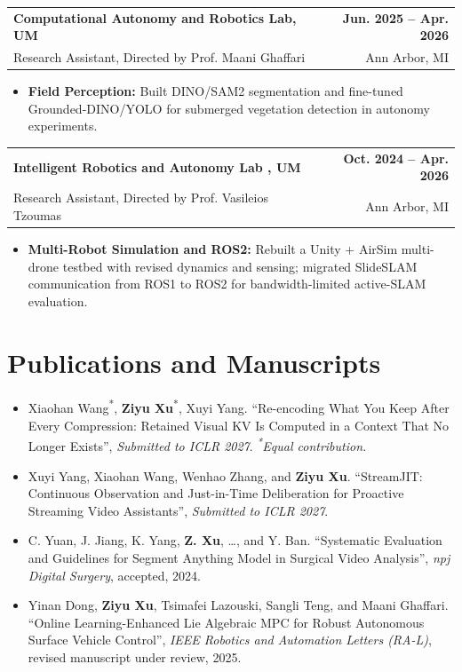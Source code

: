 \documentclass[11pt,letterpaper]{article}
\makeatletter
\newcommand{\resumeSubheading}[4]{
    \begin{tabularx}{\textwidth}{@{}Xr@{}}
        \textbf{#1} & \textbf{#2} \\
        #3 & #4 \\
    \end{tabularx}
}
\newcommand{\resumeItem}[1]{
    \item #1
}
\makeatother
\begin{document}
\resumeSubheading
{Computational Autonomy and Robotics Lab, UM }
{Jun. 2025 -- Apr. 2026}
{\hspace*{1.4em}Research Assistant, Directed by Prof. Maani Ghaffari}
{Ann Arbor, MI}
\begin{itemize}[leftmargin=2.4em, itemsep=0.5pt, topsep=0pt]
\small
\resumeItem{\textbf{Field Perception:} Built DINO/SAM2 segmentation and fine-tuned Grounded-DINO/YOLO for submerged vegetation detection in autonomy experiments.}
\end{itemize}

\resumeSubheading
{Intelligent Robotics and Autonomy Lab , UM}
{Oct. 2024 -- Apr. 2026}
{\hspace*{1.4em}Research Assistant, Directed by Prof. Vasileios Tzoumas}
{Ann Arbor, MI}
\begin{itemize}[leftmargin=2.4em, itemsep=0.5pt, topsep=0pt]
\small
\resumeItem{\textbf{Multi-Robot Simulation and ROS2:} Rebuilt a Unity + AirSim multi-drone testbed with revised dynamics and sensing; migrated SlideSLAM communication from ROS1 to ROS2 for bandwidth-limited active-SLAM evaluation.}
\end{itemize}

\section*{Publications and Manuscripts}
\begin{itemize}[leftmargin=1.4em,itemsep=3pt,topsep=2pt]
\small
\item Xiaohan Wang\textsuperscript{*}, \textbf{Ziyu Xu}\textsuperscript{*}, Xuyi Yang.      ``Re-encoding What You Keep After Every Compression: Retained Visual KV Is Computed in a Context That No Longer Exists'',      \textit{Submitted to ICLR 2027}. \textit{\textsuperscript{*}Equal contribution.}
\item Xuyi Yang, Xiaohan Wang, Wenhao Zhang, and \textbf{Ziyu Xu}.      ``StreamJIT: Continuous Observation and Just-in-Time Deliberation for Proactive Streaming Video Assistants'',      \textit{Submitted to ICLR 2027}.
\item C. Yuan, J. Jiang, K. Yang, \textbf{Z. Xu}, \ldots, and Y. Ban.      ``Systematic Evaluation and Guidelines for Segment Anything Model in Surgical Video Analysis'',      \textit{npj Digital Surgery}, accepted, 2024.
\item Yinan Dong, \textbf{Ziyu Xu}, Tsimafei Lazouski, Sangli Teng, and Maani Ghaffari.      ``Online Learning-Enhanced Lie Algebraic MPC for Robust Autonomous Surface Vehicle Control'',      \textit{IEEE Robotics and Automation Letters (RA-L)}, revised manuscript under review, 2025.
\end{itemize}
\end{document}
